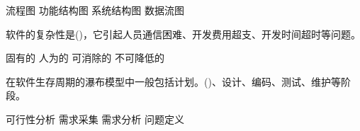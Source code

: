 \documentclass{exam}
\begin{document}
\begin{questions}
\begin{oneparchoices}
		\choice 流程图
		\choice 功能结构图
		\choice 系统结构图
		\correctchoice 数据流图
	\end{oneparchoices}
	\question 软件的复杂性是()，它引起人员通信困难、开发费用超支、开发时间超时等问题。\\
	\begin{oneparchoices}
		\correctchoice 固有的
		\choice 人为的
		\choice 可消除的
		\choice 不可降低的
	\end{oneparchoices}
	\question 在软件生存周期的瀑布模型中一般包括计划。()、设计、编码、测试、维护等阶段。\\
	\begin{oneparchoices}
		\choice 可行性分析
		\choice 需求采集
		\choice 需求分析
		\correctchoice 问题定义
	\end{oneparchoices}
\end{questions}
\end{document}
